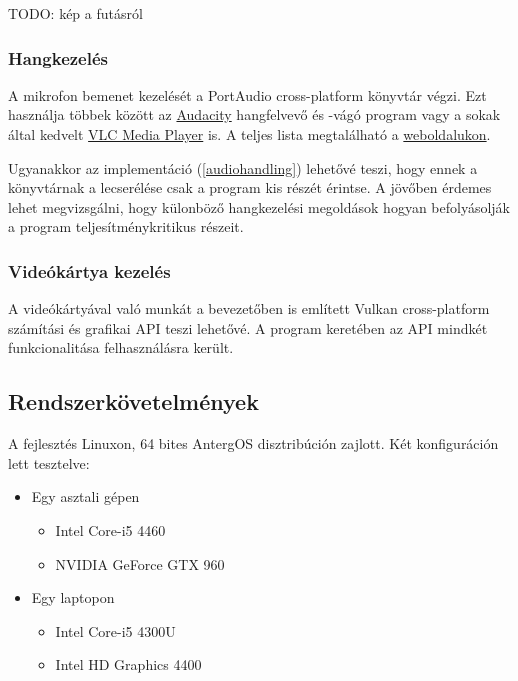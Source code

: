 TODO: k\'ep a fut\'asr\'ol

\subsubsection{Hangkezel\'es}
A mikrofon bemenet kezel\'es\'et a PortAudio cross-platform k\"onyvt\'ar v\'egzi. Ezt haszn\'alja t\"obbek k\"oz\"ott az \href{http://audacity.sourceforge.net}{Audacity} hangfelvev\H o \'es -v\'ag\'o program vagy a sokak \'altal kedvelt \href{http://www.videolan.org/vlc/}{VLC Media Player} is. A teljes lista megtal\'alhat\'o a \href{http://www.portaudio.com/apps.html}{weboldalukon}.

Ugyanakkor az implement\'aci\'o (\ref{audiohandling}) lehet\H ov\'e teszi, hogy ennek a k\"onyvt\'arnak a lecser\'el\'ese csak a program kis r\'esz\'et \'erintse.
A j\"ov\H oben \'erdemes lehet megvizsg\'alni, hogy k\"ulonb\"oz\H o hangkezel\'esi megold\'asok hogyan befoly\'asolj\'ak a program teljes\'itm\'enykritikus r\'eszeit.

\subsubsection{Vide\'ok\'artya kezel\'es}
A vide\'ok\'arty\'aval val\'o munk\'at a bevezet\H oben is eml\'itett Vulkan cross-platform sz\'am\'it\'asi \'es grafikai API teszi lehet\H ov\'e. A program keret\'eben az API mindk\'et funkcionalit\'asa felhaszn\'al\'asra ker\"ult.



\subsection{Rendszerk\"ovetelm\'enyek}\label{runrequirements}
A fejleszt\'es Linuxon, 64 bites AntergOS disztrib\'uci\'on zajlott. 
\newline
K\'et konfigur\'aci\'on lett tesztelve:
\begin{itemize}
	\item Egy asztali g\'epen
		\begin{itemize}
			\item Intel Core-i5 4460
			\item NVIDIA GeForce GTX 960
		\end{itemize}
	\item Egy laptopon
		\begin{itemize}
			\item Intel Core-i5 4300U
			\item Intel HD Graphics 4400
		\end{itemize}
\end{itemize}

